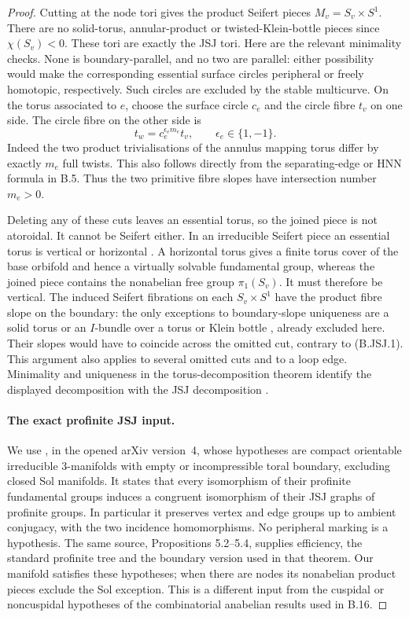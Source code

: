 \begin{proof}
Cutting at the node tori gives the product Seifert pieces
$M_v=S_v\times S^1$. There are no solid-torus, annular-product or
twisted-Klein-bottle pieces since $\chi(S_v)<0$. These tori are exactly
the JSJ tori. Here are the relevant minimality checks. None is
boundary-parallel, and no two are parallel: either possibility would
make the corresponding essential surface circles peripheral or
freely homotopic, respectively. Such circles are excluded by the stable
multicurve. On the torus associated to $e$, choose the surface circle
$c_e$ and the circle fibre $t_v$ on one side. The circle fibre on the
other side is
\[
             t_w=c_e^{\epsilon_e m_e}t_v,
             \qquad \epsilon_e\in\{1,-1\}.
\tag{B.JSJ.1}
\]
Indeed the two product trivialisations of the annulus mapping torus
differ by exactly $m_e$ full twists. This also follows directly from
the separating-edge or HNN formula in B.5. Thus the two primitive
fibre slopes have intersection number $m_e>0$.

Deleting any of these cuts leaves an essential torus, so the joined
piece is not atoroidal. It cannot be Seifert either. In an irreducible
Seifert piece an essential torus is vertical or horizontal
\citep[Proposition 1.12]{BC_Hatcher3M}. A horizontal torus gives a
finite torus cover of the base orbifold and hence a virtually solvable
fundamental group, whereas the joined piece contains the nonabelian
free group $\pi_1(S_v)$. It must therefore be vertical. The induced
Seifert fibrations on each $S_v\times S^1$ have the product fibre
slope on the boundary: the only exceptions to boundary-slope uniqueness
are a solid torus or an $I$-bundle over a torus or Klein bottle
\citep[Lemma 1.17]{BC_Hatcher3M}, already excluded here.
Their slopes would have to coincide across the omitted cut, contrary
to (B.JSJ.1). This argument also applies to several omitted cuts and
to a loop edge. Minimality and uniqueness in the torus-decomposition
theorem identify the displayed decomposition with the JSJ decomposition
\citep[Theorem 1.9]{BC_Hatcher3M}.

\paragraph{The exact profinite JSJ input.}
We use \citet[Theorem 5.5]{BC_Xu2025}, in the opened arXiv version~4,
whose hypotheses are compact orientable irreducible $3$-manifolds with
empty or incompressible toral boundary, excluding closed Sol manifolds.
It states that every isomorphism of their profinite fundamental groups
induces a congruent isomorphism of their JSJ graphs of profinite groups.
In particular it preserves vertex and edge groups up to ambient
conjugacy, with the two incidence homomorphisms. No peripheral marking
is a hypothesis. The same source, Propositions 5.2--5.4, supplies
efficiency, the standard profinite tree and the boundary version used
in that theorem. Our manifold satisfies these hypotheses; when there
are nodes its nonabelian product pieces exclude the Sol exception.
This is a different input from the cuspidal or noncuspidal hypotheses
of the combinatorial anabelian results used in B.16.


\end{proof}
